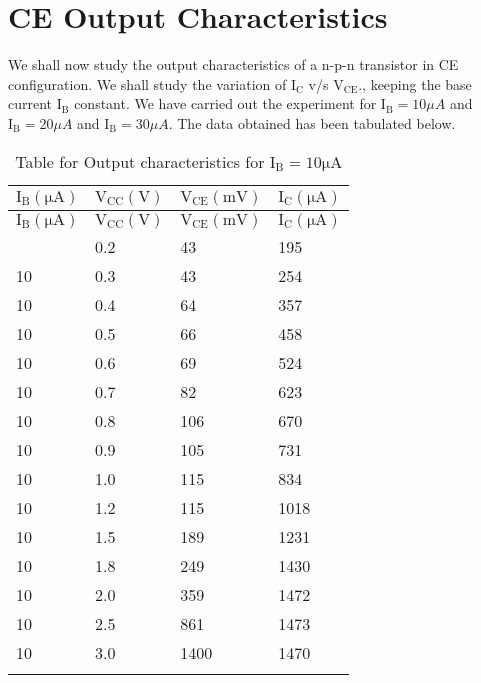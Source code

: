 \documentclass[12pt]{article}
\begin{document}
\section{CE Output Characteristics}
We shall now study the output characteristics of a n-p-n transistor in CE configuration. We shall study the variation of $\mathrm{I_C}$ v/s $\mathrm{V_{CE}}$., keeping the base current $\mathrm{I_B}$ constant. We have carried out the experiment for $\mathrm{I_B}=10 \mu A$ and $\mathrm{I_B}=20 \mu A$ and $\mathrm{I_B}= 30 \mu A$. The data obtained has been tabulated below.
\begin{longtable}{|l|l|l|l|}
	\hline
    $\mathrm{I_{B}(\mu A)}$ & $\mathrm{V_{CC}(V)}$& $\mathrm{V_{CE}(mV)}$&  $\mathrm{I_{C}(\mu A)}$ \\ \hline
	\endfirsthead
	\hline
    $\mathrm{I_{B}(\mu A)}$ & $\mathrm{V_{CC}(V)}$ & $\mathrm{V_{CE}(mV)}$&  $\mathrm{I_{C}(\mu A)}$ \\ \hline
	\endhead
	\hline
	\endfoot
	\endlastfoot
    10  & 0.2  & 43   & 195  \\ \hline
    10  & 0.3  & 43   & 254  \\ \hline
    10  & 0.4  & 64   & 357  \\ \hline
    10  & 0.5  & 66   & 458  \\ \hline
    10  & 0.6  & 69   & 524  \\ \hline
    10  & 0.7  & 82   & 623  \\ \hline
    10  & 0.8  & 106  & 670  \\ \hline
    10  & 0.9  & 105  & 731  \\ \hline
    10  & 1.0  & 115  & 834  \\ \hline
    10  & 1.2  & 115  & 1018 \\ \hline
    10  & 1.5  & 189  & 1231 \\ \hline
    10  & 1.8  & 249  & 1430 \\ \hline
    10  & 2.0  & 359  & 1472 \\ \hline
    10  & 2.5  & 861  & 1473 \\ \hline
    10  & 3.0  & 1400 & 1470 \\ \hline
\caption{Table for Output characteristics for $\mathrm{I_B=10 \mu A}$}
\end{longtable}
\end{document}
